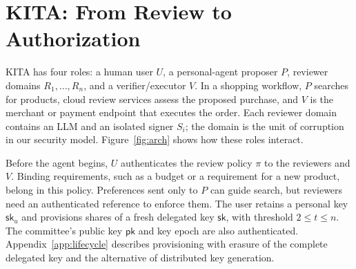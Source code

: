 \documentclass{article}
\newcommand{\sk}{\mathsf{sk}}
\newcommand{\pk}{\mathsf{pk}}
\begin{document}
\section{\textsf{KITA}: From Review to Authorization}
\label{sec:system}
\textsf{KITA} has four roles: a human user $U$, a personal-agent proposer $P$, reviewer
domains $R_1,\ldots,R_n$, and a verifier/executor $V$. In a shopping workflow,
$P$ searches for products, cloud review services assess the proposed purchase,
and $V$ is the merchant or payment endpoint that executes the order. Each
reviewer domain contains an LLM and an isolated signer $S_i$; the domain is
the unit of corruption in our security model. Figure~\ref{fig:arch} shows
how these roles interact.

Before the agent begins, $U$ authenticates the review policy $\pi$ to the
reviewers and $V$. Binding requirements, such as a budget or a requirement
for a new product, belong in this policy. Preferences sent only to $P$ can
guide search, but reviewers need an authenticated reference to enforce them.
The user retains a personal key $\sk_u$ and provisions shares of a fresh
delegated key $\sk$, with threshold $2\le t\le n$. The committee's public key
$\pk$ and key epoch are also authenticated. Appendix~\ref{app:lifecycle}
describes provisioning with erasure of the complete delegated key and the
alternative of distributed key generation.
\end{document}

